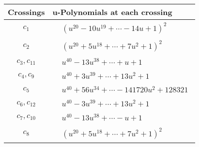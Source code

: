 \documentclass[1p]{elsarticle_modified}
\theoremstyle{definition}
\begin{document}
\begin{tabular}{m{50pt}|m{274pt}}
Crossings & \hspace{64pt}u-Polynomials at each crossing \\
\hline $$\begin{aligned}c_{1}\end{aligned}$$&$\begin{aligned}
&(u^{20}-10 u^{19}+\cdots-14 u+1)^{2}
\end{aligned}$\\
\hline $$\begin{aligned}c_{2}\end{aligned}$$&$\begin{aligned}
&(u^{20}+5 u^{18}+\cdots+7 u^2+1)^{2}
\end{aligned}$\\
\hline $$\begin{aligned}c_{3},c_{11}\end{aligned}$$&$\begin{aligned}
&u^{40}-13 u^{38}+\cdots+u+1
\end{aligned}$\\
\hline $$\begin{aligned}c_{4},c_{9}\end{aligned}$$&$\begin{aligned}
&u^{40}+3 u^{39}+\cdots+13 u^2+1
\end{aligned}$\\
\hline $$\begin{aligned}c_{5}\end{aligned}$$&$\begin{aligned}
&u^{40}+56 u^{34}+\cdots-141720 u^2+128321
\end{aligned}$\\
\hline $$\begin{aligned}c_{6},c_{12}\end{aligned}$$&$\begin{aligned}
&u^{40}-3 u^{39}+\cdots+13 u^2+1
\end{aligned}$\\
\hline $$\begin{aligned}c_{7},c_{10}\end{aligned}$$&$\begin{aligned}
&u^{40}-13 u^{38}+\cdots- u+1
\end{aligned}$\\
\hline $$\begin{aligned}c_{8}\end{aligned}$$&$\begin{aligned}
&(u^{20}+5 u^{18}+\cdots+7 u^2+1)^{2}
\end{aligned}$\\
\hline
\end{tabular}\\~\\
\end{document}
